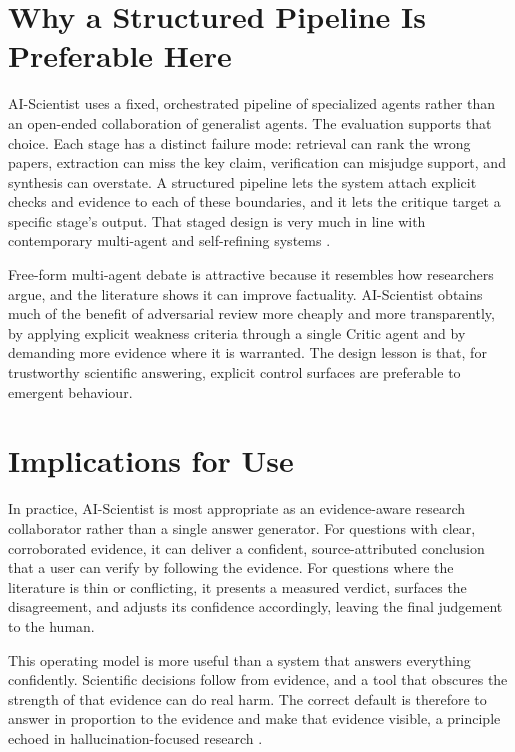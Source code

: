 \section{Why a Structured Pipeline Is Preferable Here }

AI-Scientist uses a fixed, orchestrated pipeline of specialized agents rather than an open-ended collaboration of
generalist agents. The evaluation supports that choice. Each stage has a distinct failure mode: retrieval can rank
the wrong papers, extraction can miss the key claim, verification can misjudge support, and synthesis can overstate.
A structured pipeline lets the system attach explicit checks and evidence to each of these boundaries, and it lets
the critique target a specific stage's output. That staged design is very much in line with contemporary
multi-agent and self-refining systems \cite{wu2023autogen,yao2023treeofthoughts,shinn2023reflexion}.

Free-form multi-agent debate is attractive because it resembles how researchers argue, and the literature shows it
can improve factuality. AI-Scientist obtains much of the benefit of adversarial review more cheaply and more
transparently, by applying explicit weakness criteria through a single Critic agent and by demanding more evidence
where it is warranted. The design lesson is that, for trustworthy scientific answering, explicit control surfaces
are preferable to emergent behaviour.

\section{Implications for Use }

In practice, AI-Scientist is most appropriate as an evidence-aware research collaborator rather than a single
answer generator. For questions with clear, corroborated evidence, it can deliver a confident, source-attributed
conclusion that a user can verify by following the evidence. For questions where the literature is thin or
conflicting, it presents a measured verdict, surfaces the disagreement, and adjusts its confidence accordingly,
leaving the final judgement to the human.

This operating model is more useful than a system that answers everything confidently. Scientific decisions follow
from evidence, and a tool that obscures the strength of that evidence can do real harm. The correct default is
therefore to answer in proportion to the evidence and make that evidence visible, a principle echoed in
hallucination-focused research \cite{ji2023hallucination,huang2023hallucinationsurvey}.


